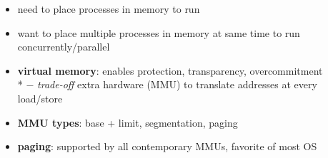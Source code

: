 \begin{summary}
  \begin{itemize}
    \item need to place processes in memory to run
    \item want to place multiple processes in memory at same time to run concurrently/parallel
    \item \textbf{virtual memory}: enables protection, transparency, overcommitment \\*
      $ - $ \emph{trade-off} extra hardware (MMU) to translate addresses at every load/store
    \item \textbf{MMU types}: base + limit, segmentation, paging
    \item \textbf{paging}: supported by all contemporary MMUs, favorite of most OS
  \end{itemize}
\end{summary}